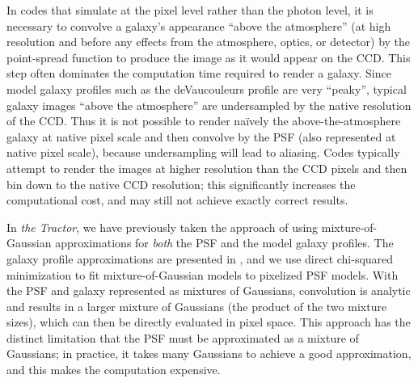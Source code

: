 \documentclass[11pt,preprint]{aastex}
\newcommand{\project}[1]{\textsl{#1}}
\begin{document}

In codes that simulate at the pixel level rather than the photon
level, it is necessary to convolve a galaxy's appearance ``above the
atmosphere'' (at high resolution and before any effects from the
atmosphere, optics, or detector) by the point-spread function to
produce the image as it would appear on the CCD.  This step often
dominates the computation time required to render a galaxy.  Since
model galaxy profiles such as the deVaucouleurs profile are very
``peaky'', typical galaxy images ``above the atmosphere'' are
undersampled by the native resolution of the CCD.  Thus it is not
possible to render na\"ively the above-the-atmosphere galaxy at native
pixel scale and then convolve by the PSF (also represented at native
pixel scale), because undersampling will lead to aliasing.  Codes
typically attempt to render the images at higher resolution than the
CCD pixels and then bin down to the native CCD resolution; this
significantly increases the computational cost, and may still not
achieve exactly correct results.

In \project{the Tractor}, we have previously taken the approach of
using mixture-of-Gaussian approximations for \emph{both} the PSF and
the model galaxy profiles.  The galaxy profile approximations are
presented in \cite{moggalaxy}, and we use direct chi-squared
minimization to fit mixture-of-Gaussian models to pixelized PSF
models.  With the PSF and galaxy represented as mixtures of Gaussians,
convolution is analytic and results in a larger mixture of Gaussians
(the product of the two mixture sizes), which can then be directly
evaluated in pixel space.  This approach has the distinct limitation
that the PSF must be approximated as a mixture of Gaussians; in
practice, it takes many Gaussians to achieve a good approximation, and
this makes the computation expensive.
\end{document}
